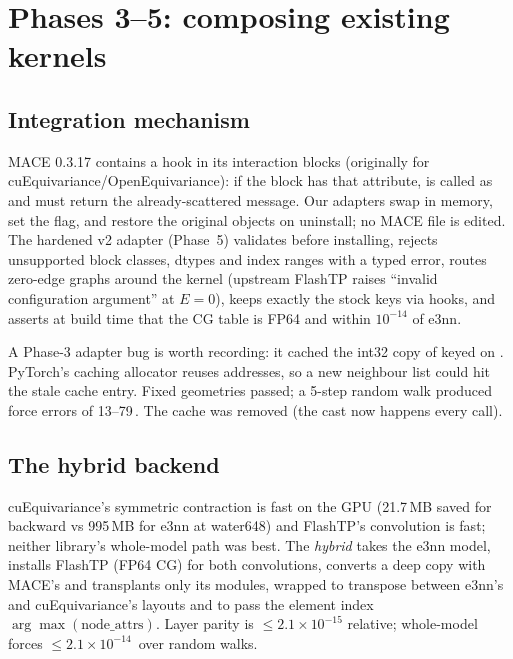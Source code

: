 \section{Phases 3--5: composing existing kernels}
\label{sec:backends}

\subsection{Integration mechanism}
MACE 0.3.17 contains a  hook in its interaction blocks (originally for cuEquivariance/OpenEquivariance): if the block has that attribute,  is called as  and must return the already-scattered message. Our adapters swap  in memory, set the flag, and restore the original objects on uninstall; no MACE file is edited. The hardened v2 adapter (Phase~5) validates before installing, rejects unsupported block classes, dtypes and index ranges with a typed error, routes zero-edge graphs around the kernel (upstream FlashTP raises ``invalid configuration argument'' at $E=0$), keeps exactly the stock  keys via hooks, and asserts at build time that the CG table is FP64 and within $10^{-14}$ of e3nn.

A Phase-3 adapter bug is worth recording: it cached the int32 copy of  keyed on . PyTorch's caching allocator reuses addresses, so a new neighbour list could hit the stale cache entry. Fixed geometries passed; a 5-step random walk produced force errors of 13--79\,\eVA. The cache was removed (the cast now happens every call).

\subsection{The hybrid backend}
cuEquivariance's symmetric contraction is fast on the GPU (21.7\,MB saved for backward vs 995\,MB for e3nn at water648) and FlashTP's convolution is fast; neither library's whole-model path was best. The \emph{hybrid} takes the e3nn model, installs FlashTP (FP64 CG) for both convolutions, converts a deep copy with MACE's  and transplants only its  modules, wrapped to transpose between e3nn's  and cuEquivariance's  layouts and to pass the element index $\arg\max(\text{node\_attrs})$. Layer parity is $\le2.1\times10^{-15}$ relative; whole-model forces $\le2.1\times10^{-14}$\,\eVA{} over random walks.

